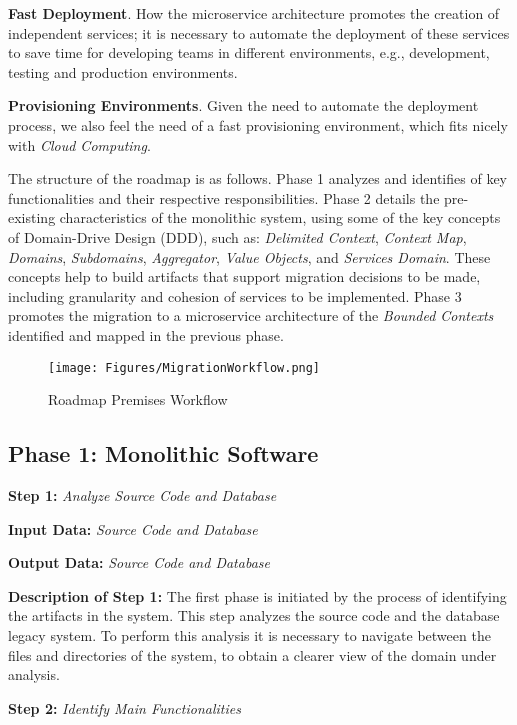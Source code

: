 \documentclass[a4paper,twoside]{article}
\begin{document}
\textbf{Fast Deployment}. How the microservice architecture promotes the creation of independent services; it is necessary to automate the deployment of these services to save time for developing teams in different environments, e.g., development, testing and production environments.

\textbf{Provisioning Environments}. Given the need to automate the deployment process, we also feel the need of a fast provisioning environment, which fits nicely with \textit{Cloud Computing}.

The structure of the roadmap is as follows. Phase 1 analyzes and identifies of key functionalities and their respective responsibilities. Phase 2 details the pre-existing characteristics of the monolithic system, using some of the key concepts of Domain-Drive Design (DDD), such as: \textit{Delimited Context}, \textit{Context Map}, \textit{Domains}, \textit{Subdomains}, \textit{Aggregator}, \textit{Value Objects}, and \textit{Services Domain}. These concepts help to build artifacts that support migration decisions to be made, including granularity and cohesion of services to be implemented. Phase 3 promotes the migration to a microservice architecture of the \textit{Bounded Contexts} identified and mapped in the previous phase.

\begin{figure}
\centering
\texttt{[image: Figures/MigrationWorkflow.png]}
\caption{Roadmap Premises Workflow}
\label{fig:MigrationSteps}
\end{figure}

\subsection{Phase 1: Monolithic Software}

\noindent
\textbf{Step 1:}
\textit{Analyze Source Code and Database}

\textbf{Input Data:}
\textit{Source Code and Database}

\textbf{Output Data:}
\textit{Source Code and Database}

\textbf{Description of Step 1:}
The first phase is initiated by the process of identifying the artifacts in the system. This step analyzes the source code and the database legacy system. To perform this analysis it is necessary to navigate between the files and directories of the system, to obtain a clearer view of the domain under analysis.

\noindent
\textbf{Step 2:}
\textit{Identify Main Functionalities}
\end{document}
